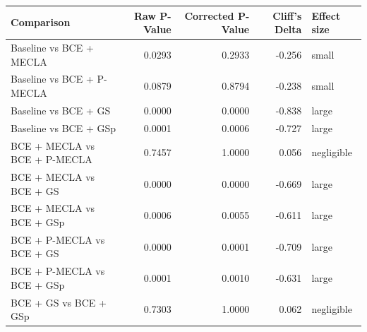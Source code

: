 \begin{tabular}{lrrrl}
\toprule
Comparison & Raw P-Value & Corrected P-Value & Cliff's Delta & Effect size \\
\midrule
Baseline vs BCE + MECLA & 0.0293 & 0.2933 & -0.256 & small \\
Baseline vs BCE + P-MECLA & 0.0879 & 0.8794 & -0.238 & small \\
Baseline vs BCE + GS & 0.0000 & 0.0000 & -0.838 & large \\
Baseline vs BCE + GSp & 0.0001 & 0.0006 & -0.727 & large \\
BCE + MECLA vs BCE + P-MECLA & 0.7457 & 1.0000 & 0.056 & negligible \\
BCE + MECLA vs BCE + GS & 0.0000 & 0.0000 & -0.669 & large \\
BCE + MECLA vs BCE + GSp & 0.0006 & 0.0055 & -0.611 & large \\
BCE + P-MECLA vs BCE + GS & 0.0000 & 0.0001 & -0.709 & large \\
BCE + P-MECLA vs BCE + GSp & 0.0001 & 0.0010 & -0.631 & large \\
BCE + GS vs BCE + GSp & 0.7303 & 1.0000 & 0.062 & negligible \\
\bottomrule
\end{tabular}
